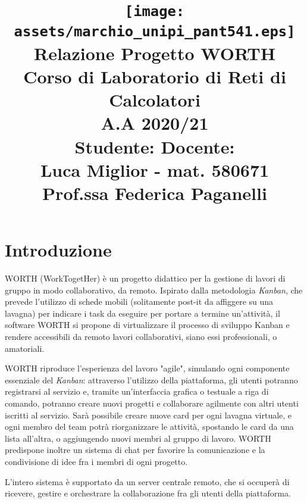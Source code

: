 \documentclass{article}
\title{
    \texttt{[image: assets/marchio\_unipi\_pant541.eps]}\\[1cm]
    Relazione Progetto WORTH \\[1ex]
    \large{Corso di Laboratorio di Reti di Calcolatori\\[1ex] A.A 2020/21}\\[1.5cm]
    \noindent \textbf{Studente:} \hfill \textbf{Docente:}\\
    \noindent Luca Miglior - mat. 580671 \hfill Prof.ssa Federica Paganelli
}
\date{}
\begin{document}
\maketitle

\tableofcontents{}
\newpage


\section{Introduzione}
WORTH (WorkTogetHer) è un progetto didattico per la gestione di lavori di gruppo in modo collaborativo, da remoto. Ispirato dalla metodologia \emph{Kanban}, che prevede l'utilizzo di schede mobili (solitamente post-it da affiggere su una lavagna) per indicare i task da eseguire per portare a termine un'attività, il software WORTH si propone di virtualizzare il processo di sviluppo Kanban e rendere accessibili da remoto lavori collaborativi, siano essi professionali, o amatoriali.

WORTH riproduce l'esperienza del lavoro "agile", simulando ogni componente essenziale del \emph{Kanban}: attraverso l'utilizzo della piattaforma, gli utenti potranno registrarsi al servizio e, tramite un'interfaccia grafica o testuale a riga di comando, potranno creare nuovi progetti e collaborare agilmente con altri utenti iscritti al servizio. Sarà possibile creare nuove card per ogni lavagna virtuale, e ogni membro del team potrà riorganizzare le attività, spostando le card da una lista all'altra, o aggiungendo nuovi membri al gruppo di lavoro. WORTH predispone inoltre un sistema di chat per favorire la comunicazione e la condivisione di idee fra i membri di ogni progetto.

L'intero sistema è supportato da un server centrale remoto, che si occuperà di ricevere, gestire e orchestrare la collaborazione fra gli utenti della piattaforma.
\end{document}
